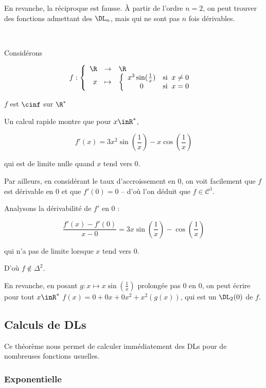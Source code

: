 \documentclass[12pt]{article}
\begin{document}
En revanche, la réciproque est fausse. À partir de l'ordre $n=2$, on peut
trouver des fonctions admettant des $\DL_n$, mais qui ne sont pas $n$ fois
dérivables.

\begin{Exem}~

Considérons

\[
f : \left\{
\begin{array}{rcl}
\R  & \to & \R \\
x & \mapsto & \left\{
\begin{array}{cl} 
  x^3 \sin(\frac{1}{x}) & \text{si}\;\; x\neq 0\\
  0 & \text{si}\;\; x=0 
\end{array}
\right.
\end{array}
\right.
\]

$f$ est $\cinf$ sur $\R^*$

Un calcul rapide montre que pour $x\inR^*$, 

$$f'(x)=3x^2\sin(\frac{1}{x}) - x
\cos(\frac{1}{x})$$

qui est de limite nulle quand $x$ tend vers 0.

Par ailleurs, en considérant le taux d'accroissement en 0, on voit
facilement que $f$ est dérivable en $0$ et que $f'(0)=0$ -- d'où l'on déduit
que $f \in \mathcal{C}^1$.

Analysons la dérivabilité de $f'$ en $0$ :

$$\frac{f'(x) - f'(0)}{x-0}=3x\sin(\frac{1}{x}) - 
\cos(\frac{1}{x})$$

qui n'a pas de limite lorsque $x$ tend vers 0.

D'où $f
\notin \Delta^2$.

 
En revanche, en posant $g:x\mapsto x\sin(\frac{1}{x})$ prolongée pas $0$ en
$0$, on peut écrire pour tout $x\inR^*$ $f(x)=0+0x+0x^2+x^2(g(x))$, qui
est un $\DL_2(0)$ de $f$. 



\end{Exem}


\subsection{Calculs de DLs}

Ce théorème nous permet de calculer immédiatement des DLs pour de
nombreuses fonctions usuelles.

\subsubsection{Exponentielle}
\end{document}
